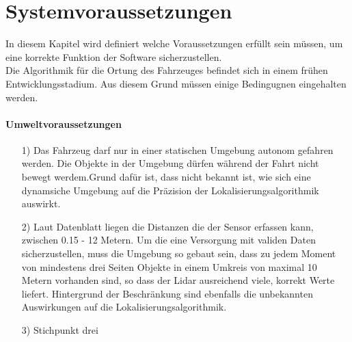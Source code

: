 \section{Systemvoraussetzungen}
In diesem Kapitel wird definiert welche Voraussetzungen erfüllt sein müssen, um eine korrekte Funktion der Software sicherzustellen.\\
Die Algorithmik für die Ortung des Fahrzeuges befindet sich in einem frühen Entwicklungsstadium. Aus diesem Grund müssen einige Bedingugnen eingehalten werden. 
\paragraph{Umweltvoraussetzungen}
\begin{itemize}
    \item[1)] Das Fahrzeug darf nur in einer statischen Umgebung autonom gefahren werden. Die Objekte in der Umgebung dürfen während der Fahrt nicht bewegt werdem.Grund dafür ist, dass nicht bekannt ist, wie sich eine dynamsiche Umgebung auf die Präzision der Lokalisierungsalgorithmik auswirkt. 
    \item[2)] Laut Datenblatt \cite{Slamtec2020} liegen die Distanzen die der Sensor erfassen kann, zwischen 0.15 - 12 Metern. Um die eine Versorgung mit validen Daten sicherzustellen, muss die Umgebung so gebaut sein, dass zu jedem Moment von mindestens drei Seiten Objekte in einem Umkreis von maximal 10 Metern vorhanden sind, so dass der Lidar ausreichend viele, korrekt Werte liefert.  Hintergrund der Beschränkung sind ebenfalls die unbekannten Auswirkungen auf die Lokalisierungsalgorithmik.
    \item[3)] Stichpunkt drei
\end{itemize}

\newpage